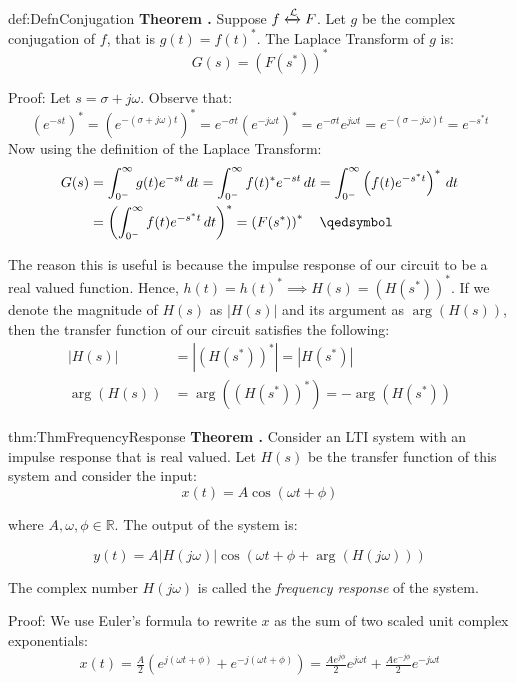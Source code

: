 \documentclass[14pt,a5paper,twoside]{book}
\newenvironment{myTheorem}[2]{ \begin{Theorem}[adjusted title=#1]{}{#2} 
  \textbf{Theorem \thetcbcounter.} \label{#2}}{\end{Theorem}}
\begin{document}
\begin{myTheorem}{Conjugation Property of the Laplace Transform}{def:DefnConjugation}
Suppose $f \xleftrightarrow{\mathcal{L}} F$. Let $g$ be the complex conjugation of $f$, that is $g(t) = f(t)^*$. The Laplace Transform of $g$ is:
$$
G(s) = \left(F(s^*)\right)^*
$$
\end{myTheorem}
Proof: Let $s = \sigma +j\omega$. Observe that:
$$
\left(e^{-st}\right)^* = \left(e^{-(\sigma +j\omega)t}\right)^* = e^{-\sigma t}\left(e^{-j\omega t}\right)^* = e^{-\sigma t}e^{j\omega t} = e^{-(\sigma-j\omega)t} = e^{-s^*t} 
$$
Now using the definition of the Laplace Transform:
\begin{align*}
G(s) &= \int_{0^-}^\infty g(t) e^{-st}\,dt = \int_{0^-}^\infty f(t)^* e^{-st}\,dt  = \int_{0^-}^\infty \left(f(t)e^{-s^*t}\right)^*\,dt
\\ &= \left(\int_{0^-}^\infty f(t)e^{-s^*t}\,dt\right)^* = \left(F(s^*)\right)^* \quad\qedsymbol
\end{align*}

The reason this is useful is because the impulse response of our circuit to be a real valued function. Hence, $h(t) = h(t)^*\implies H(s) = \left(H(s^*)\right)^*$. If we denote the magnitude of $H(s)$ as $|H(s)|$ and its argument as $\arg(H(s))$, then the transfer function of our circuit satisfies the following:
\begin{align*}
|H(s)| &= |\left(H(s^*)\right)^*| = |H(s^*)| \\
\arg(H(s)) &= \arg\left(\left(H(s^*)\right)^*\right) = -\arg(H(s^*))
\end{align*}

\begin{myTheorem}{Frequency Response}{thm:ThmFrequencyResponse}
Consider an LTI system with an impulse response that is real valued. Let $H(s)$ be the transfer function of this system and consider the input:
$$
x(t) = A \cos(\omega t + \phi)
$$

where $A,\omega,\phi\in\mathbb{R}$. The output of the system is:

$$
y(t) = A |H(j\omega)| \cos\left(\omega t + \phi + \arg(H(j\omega))\right)
$$

The complex number $H(j\omega)$ is called the \emph{frequency response} of the system.
\end{myTheorem}

Proof: We use Euler's formula to rewrite $x$ as the sum of two scaled unit complex exponentials:
\begin{align*}
x(t) = \frac{A}{2}\left(e^{j(\omega t +\phi)} + e^{-j(\omega t +\phi)}\right) = \frac{Ae^{j\phi}}{2}e^{j\omega t} + \frac{Ae^{-j\phi}}{2} e^{-j\omega t}
\end{align*}
\end{document}
